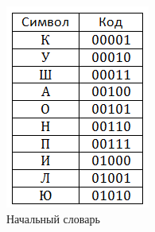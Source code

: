 \begin{figure}[H]
	\begin{center}
		\includegraphics[scale=1]{../pics/LZW/dictionary.png}
		\caption{Начальный словарь} 
		\label{pic:lzw:dictionary}
	\end{center}
\end{figure}

